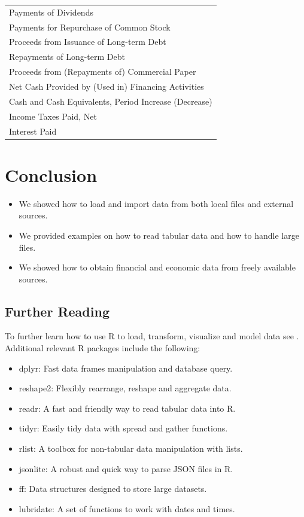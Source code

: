 \documentclass[]{book}
\providecommand{\tightlist}{%
  \setlength{\itemsep}{0pt}\setlength{\parskip}{0pt}}
\theoremstyle{definition}
\theoremstyle{definition}
\theoremstyle{definition}
\theoremstyle{remark}
\begin{document}
\begin{table}[t]
\begin{tabular}{l}
Payments of Dividends\\
Payments for Repurchase of Common Stock\\
Proceeds from Issuance of Long-term Debt\\
Repayments of Long-term Debt\\
\addlinespace
Proceeds from (Repayments of) Commercial Paper\\
Net Cash Provided by (Used in) Financing Activities\\
Cash and Cash Equivalents, Period Increase (Decrease)\\
Income Taxes Paid, Net\\
Interest Paid\\
\bottomrule
\end{tabular}
\end{table}

\section{Conclusion}\label{conclusion}

\begin{itemize}
\tightlist
\item
  We showed how to load and import data from both local files and
  external sources.
\item
  We provided examples on how to read tabular data and how to handle
  large files.
\item
  We showed how to obtain financial and economic data from freely
  available sources.
\end{itemize}

\subsection{Further Reading}\label{further-reading}

To further learn how to use R to load, transform, visualize and model
data see \citep{Wickham:2017:RDS:3086927}. Additional relevant R
packages include the following:

\begin{itemize}
\tightlist
\item
  dplyr: Fast data frames manipulation and database query.
\item
  reshape2: Flexibly rearrange, reshape and aggregate data.
\item
  readr: A fast and friendly way to read tabular data into R.
\item
  tidyr: Easily tidy data with spread and gather functions.
\item
  rlist: A toolbox for non-tabular data manipulation with lists.
\item
  jsonlite: A robust and quick way to parse JSON files in R.
\item
  ff: Data structures designed to store large datasets.
\item
  lubridate: A set of functions to work with dates and times.
\end{itemize}
\end{document}
